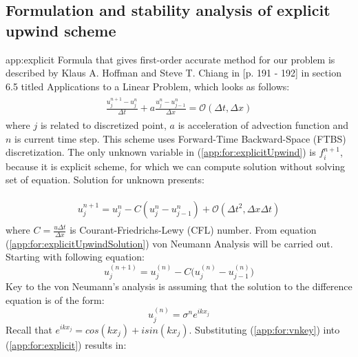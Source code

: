 \subsection{Formulation and stability analysis of explicit upwind scheme}{app:explicit}
	Formula that gives first-order accurate method for our problem is described by Klaus A. Hoffman and Steve T. Chiang in \cite{bib:hoffman}[p. 191 - 192] in section 6.5 titled Applications to a Linear Problem, which looks as follows:
		\begin{align}
			\label{app:for:explicitUpwind}
			\begin{split}
				\frac{u_j^{n+1} - u_j^n}{\Delta t} + a\frac{u_j^n - u_{j-1}^n}{\Delta x} = \mathcal{O}(\Delta t, \Delta x)
			\end{split}
		\end{align}
	where $j$ is related to discretized point, $a$ is acceleration of advection function and $n$ is current time step. This scheme uses Forward-Time Backward-Space (FTBS) discretization.
	The only unknown variable in (\ref{app:for:explicitUpwind}) is $f_i^{n+1}$, because it is explicit scheme, for which we can compute solution without solving set of equation. Solution for unknown presents:
	
		\begin{align}
			\label{app:for:explicitUpwindSolution}
			\begin{split}
				u_j^{n+1} = u_j^n - C(u_j^n - u_{j-1}^n) + \mathcal{O}(\Delta t^2, \Delta x \Delta t)
			\end{split}			
		\end{align}
	where $C=\frac{u\Delta t}{\Delta x}$ is Courant-Friedrichs-Lewy (CFL) number.	
	From equation (\ref{app:for:explicitUpwindSolution}) von Neumann Analysis will be carried out. Starting with following equation:
	\begin{equation}
		\label{app:for:explicit}
		u_j^{(n+1)} = u_j^{(n)} - C\Big(u_j^{(n)} - u_{j-1}^{(n)}\Big)
	\end{equation}	
	Key to the von Neumann's analysis is assuming that the solution to the difference equation is of the form:
	\begin{equation}
		\label{app:for:vnkey}
		u_j^{(n)} = \sigma^ne^{ikx_j}
	\end{equation}	
	Recall that $e^{ikx_j} = cos(kx_j) + isin(kx_j)$. Substituting (\ref{app:for:vnkey}) into (\ref{app:for:explicit}) results in:
	
